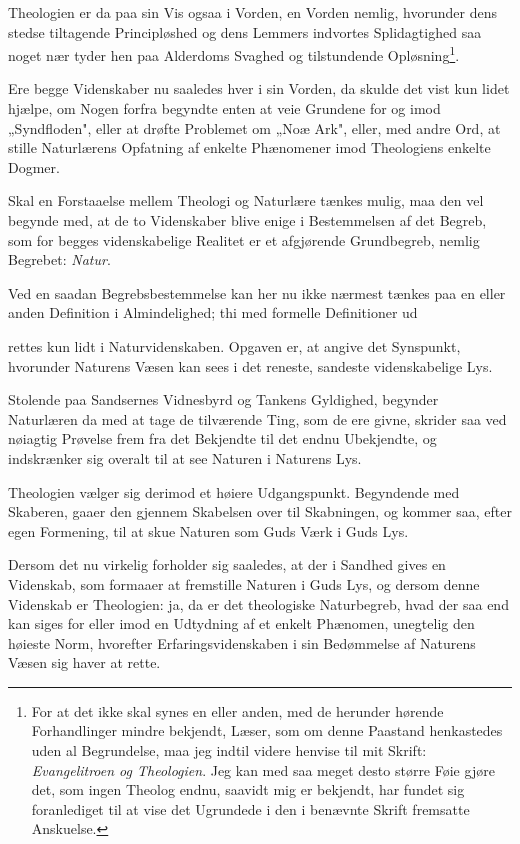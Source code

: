 \documentclass[12pt,a4paper]{article}
\newcommand{\opage}[1]{\marginnote{\footnotesize\textit{[#1]}}}
\begin{document}
Theologien er da paa sin Vis ogsaa i Vorden, en Vorden nemlig, hvorunder
dens stedse tiltagende Principløshed og dens Lemmers indvortes Splidagtighed
saa noget nær tyder hen paa Alderdoms Svaghed og tilstundende
Opløsning\footnote{For at det ikke skal synes en eller anden, med de herunder
hørende Forhandlinger mindre bekjendt, Læser, som om denne Paastand
henkastedes uden al Begrundelse, maa jeg indtil videre henvise til mit
Skrift: \emph{Evangelitroen og Theologien}. Jeg kan med saa meget desto
større Føie gjøre det, som ingen Theolog endnu, saavidt mig er bekjendt, har
fundet sig foranlediget til at vise det Ugrundede i den i benævnte Skrift
fremsatte Anskuelse.}.

Ere begge Videnskaber nu saaledes hver i sin Vorden, da skulde det vist kun
lidet hjælpe, om Nogen forfra begyndte enten at veie Grundene for og imod
„Syndfloden", eller at drøfte Problemet om „Noæ Ark", eller, med andre
Ord, at stille Naturlærens Opfatning af enkelte Phænomener imod Theologiens
enkelte Dogmer.

Skal en Forstaaelse mellem Theologi og Naturlære tænkes mulig, maa den vel
begynde med, at de to Videnskaber blive enige i Bestemmelsen af det Begreb,
som for begges videnskabelige Realitet er et afgjørende Grundbegreb, nemlig
Begrebet: \emph{Natur}.

Ved en saadan Begrebsbestemmelse kan her nu ikke nærmest tænkes paa en eller
anden Definition i Almindelighed; thi med formelle Definitioner ud\-

\opage{5} rettes kun lidt i Naturvidenskaben. Opgaven er, at angive det Synspunkt,
hvorunder Naturens Væsen kan sees i det reneste, sandeste videnskabelige Lys.

Stolende paa Sandsernes Vidnesbyrd og Tankens Gyldighed, begynder
Naturlæren da med at tage de tilværende Ting, som de ere givne, skrider saa
ved nøiagtig Prøvelse frem fra det Bekjendte til det endnu Ubekjendte, og
indskrænker sig overalt til at see Naturen i Naturens Lys.

Theologien vælger sig derimod et høiere Udgangspunkt. Begyndende
med Skaberen, gaaer den gjennem Skabelsen over til Skabningen, og kommer
saa, efter egen Formening, til at skue Naturen som Guds Værk i Guds Lys.

Dersom det nu virkelig forholder sig saaledes, at der i Sandhed gives
en Videnskab, som formaaer at fremstille Naturen i Guds Lys, og dersom
denne Videnskab er Theologien: ja, da er det theologiske Naturbegreb, hvad der
saa end kan siges for eller imod en Udtydning af et enkelt Phænomen, unegtelig
den høieste Norm, hvorefter Erfaringsvidenskaben i sin Bedømmelse af
Naturens Væsen sig haver at rette.
\end{document}

